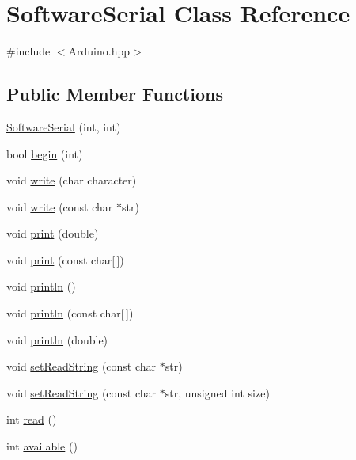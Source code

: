 \hypertarget{classSoftwareSerial}{}\section{Software\+Serial Class Reference}
\label{classSoftwareSerial}


{\ttfamily \#include $<$Arduino.\+hpp$>$}

\subsection*{Public Member Functions}
\begin{DoxyCompactItemize}
\item 
\hyperlink{classSoftwareSerial_a1b210e496954d0606965d0881dd87ad5}{Software\+Serial} (int, int)
\item 
bool \hyperlink{classSoftwareSerial_aa2a193a9ec41bba10ed98c3cecdf01ef}{begin} (int)
\item 
void \hyperlink{classSoftwareSerial_a34805f5761728dc18a55fc4d690b07a2}{write} (char character)
\item 
void \hyperlink{classSoftwareSerial_a7a301750ef5f7fd1cf0b7ee58fd58aa1}{write} (const char $\ast$str)
\item 
void \hyperlink{classSoftwareSerial_a954404a3b24c2f3f3c86668caa608846}{print} (double)
\item 
void \hyperlink{classSoftwareSerial_a4178eec2a19e24e92b59f63ac5acc727}{print} (const char\mbox{[}$\,$\mbox{]})
\item 
void \hyperlink{classSoftwareSerial_a9d8c321c74f25fff81b11f4648980b0f}{println} ()
\item 
void \hyperlink{classSoftwareSerial_a24e7e5cad20be55d6faffce424d85e23}{println} (const char\mbox{[}$\,$\mbox{]})
\item 
void \hyperlink{classSoftwareSerial_a2e1446ca3ee5972df9faf783203f3646}{println} (double)
\item 
void \hyperlink{classSoftwareSerial_ad91c72e8399905f32fc17c0b4a25002e}{set\+Read\+String} (const char $\ast$str)
\item 
void \hyperlink{classSoftwareSerial_a39437d02e6ff8e8783aa483196567bd2}{set\+Read\+String} (const char $\ast$str, unsigned int size)
\item 
int \hyperlink{classSoftwareSerial_a2d0b2f2868d519c716114777f482705b}{read} ()
\item 
int \hyperlink{classSoftwareSerial_a4cbf77a4e90e15ca576972d7952659c5}{available} ()
\end{DoxyCompactItemize}
